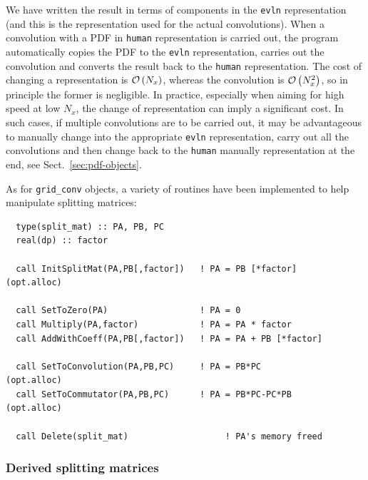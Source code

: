 \documentclass[12pt]{article}
\newcommand{\comment}[1]{\textbf{[#1]}}
\newcommand{\ttt}[1]{\texttt{#1}}
\newcommand{\order}[1]{{\cal O}\left(#1\right)}
\begin{document}
We have written the result in terms of components in the \ttt{evln}
representation (and this is the representation used for the actual
convolutions). When a convolution with a PDF in \ttt{human}
representation is carried out, the program automatically copies the
PDF to the \ttt{evln} representation, carries out the convolution and
converts the result back to the \ttt{human} representation.
%
The cost of changing a representation is $\order{N_x}$, whereas the
convolution is $\order{N^2_x}$, so in principle the former is
negligible. In practice, especially when aiming for high speed at low
$N_x$, the change of representation can imply a significant cost. In
such cases, if multiple convolutions are to be carried out, it may be
advantageous to manually change into the appropriate \ttt{evln}
representation, carry out all the convolutions and then change back to
the \ttt{human} manually representation at the end, see
Sect.~\ref{sec:pdf-objects}.
%

As for \ttt{grid\_conv} objects, a variety of routines have been
implemented to help manipulate splitting matrices:
\begin{lstlisting}
  type(split_mat) :: PA, PB, PC
  real(dp) :: factor

  call InitSplitMat(PA,PB[,factor])   ! PA = PB [*factor]   (opt.alloc)

  call SetToZero(PA)                  ! PA = 0
  call Multiply(PA,factor)            ! PA = PA * factor               
  call AddWithCoeff(PA,PB[,factor])   ! PA = PA + PB [*factor]

  call SetToConvolution(PA,PB,PC)     ! PA = PB*PC          (opt.alloc)
  call SetToCommutator(PA,PB,PC)      ! PA = PB*PC-PC*PB    (opt.alloc)
  
  call Delete(split_mat)                   ! PA's memory freed
\end{lstlisting}


\subsubsection{Derived splitting matrices}
\label{sec:derived-split-matrices}
\end{document}

